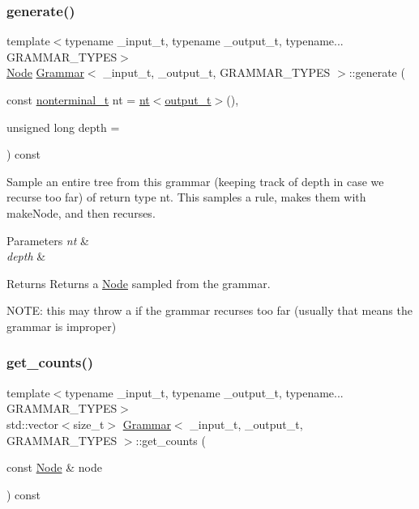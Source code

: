 \mbox{\label{class_grammar_a63735fcfa3049ea5daef9dc5f5cb8a3e}} 
\subsubsection{\texorpdfstring{generate()}{generate()}}
{\footnotesize\ttfamily template$<$typename \+\_\+input\+\_\+t, typename \+\_\+output\+\_\+t, typename... G\+R\+A\+M\+M\+A\+R\+\_\+\+T\+Y\+P\+ES$>$ \\
\hyperlink{class_node}{Node} \hyperlink{class_grammar}{Grammar}$<$ \+\_\+input\+\_\+t, \+\_\+output\+\_\+t, G\+R\+A\+M\+M\+A\+R\+\_\+\+T\+Y\+P\+ES $>$\+::generate (\begin{DoxyParamCaption}\item[{const \hyperlink{_nonterminal_8h_a1c5bfe9b903f69c83bbde5da7035fef3}{nonterminal\+\_\+t}}]{nt = {\ttfamily \hyperlink{class_grammar_ac7ec043aec5203a2cfac44f9cec50132}{nt}$<$\hyperlink{class_grammar_aee7630d758322022048d06605b07e697}{output\+\_\+t}$>$()},  }\item[{unsigned long}]{depth = {} }\end{DoxyParamCaption}) const\hspace{0.3cm}{\ttfamily [inline]}}

Sample an entire tree from this grammar (keeping track of depth in case we recurse too far) of return type nt. This samples a rule, makes them with make\+Node, and then recurses. 
\begin{DoxyParams}{Parameters}
{\em nt} & \\
\hline
{\em depth} & \\
\hline
\end{DoxyParams}
\begin{DoxyReturn}{Returns}
Returns a \hyperlink{class_node}{Node} sampled from the grammar.
\end{DoxyReturn}
N\+O\+TE\+: this may throw a if the grammar recurses too far (usually that means the grammar is improper)\mbox{\label{class_grammar_a354a5d9bdaced96748c599bc7c3bd64a}} 
\subsubsection{\texorpdfstring{get\+\_\+counts()}{get\_counts()}}
{\footnotesize\ttfamily template$<$typename \+\_\+input\+\_\+t, typename \+\_\+output\+\_\+t, typename... G\+R\+A\+M\+M\+A\+R\+\_\+\+T\+Y\+P\+ES$>$ \\
std\+::vector$<$size\+\_\+t$>$ \hyperlink{class_grammar}{Grammar}$<$ \+\_\+input\+\_\+t, \+\_\+output\+\_\+t, G\+R\+A\+M\+M\+A\+R\+\_\+\+T\+Y\+P\+ES $>$\+::get\+\_\+counts (\begin{DoxyParamCaption}\item[{const \hyperlink{class_node}{Node} \&}]{node }\end{DoxyParamCaption}) const\hspace{0.3cm}{\ttfamily [inline]}}

